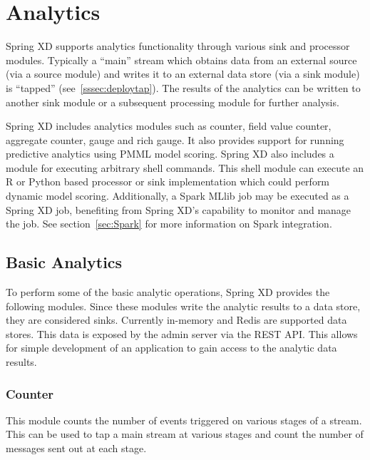 \section{Analytics}
\label{sec:Analytics}

Spring XD supports analytics functionality through various sink and processor modules.
Typically a ``main'' stream which obtains data from an external source (via
a source module) and writes it to an external data store (via a sink module)
is ``tapped'' (see~\ref{sssec:deploytap}).
The results of the analytics can be written to another sink module or a
subsequent processing module for further analysis.

\par

Spring XD includes analytics modules such as counter, field value counter,
aggregate counter, gauge and rich gauge. It also provides support for running
predictive analytics using PMML\cite{pmml} model scoring. Spring XD also includes a module
for executing arbitrary shell commands. This shell module can execute an R\cite{r-language}
or Python\cite{python-language} based processor or sink implementation which could perform
dynamic model scoring. Additionally, a Spark MLlib job may be executed as a Spring XD job,
benefiting from Spring XD's capability to monitor and manage the job. See section~\ref{sec:Spark}
for more information on Spark integration.

\subsection {Basic Analytics}

To perform some of the basic analytic operations, Spring XD provides the following
modules. Since these modules write the analytic results to a data store, they are
considered sinks. Currently in-memory and Redis\cite{redis} are supported data stores. This
data is exposed by the admin server via the REST API. This allows for simple
development of an application to gain access to the analytic data results.

\subsubsection {Counter}

This module counts the number of events triggered on various stages of a stream.
This can be used to tap a main stream at various stages and count the number
of messages sent out at each stage.

